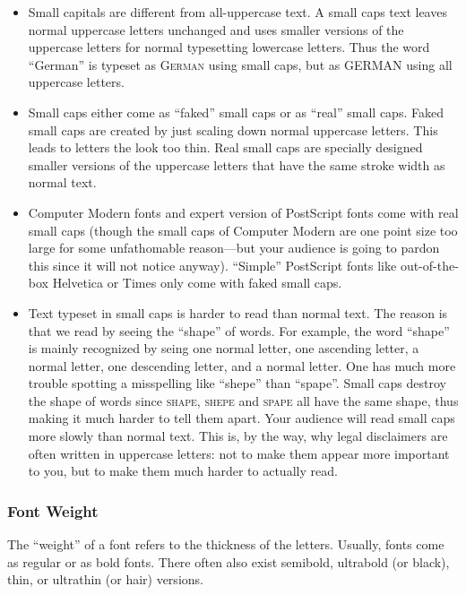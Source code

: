 \begin{itemize}
\item
  Small capitals are different from all-uppercase text. A small caps
  text leaves normal uppercase letters unchanged and uses smaller
  versions of the uppercase letters for normal typesetting lowercase
  letters. Thus the word ``German'' is typeset as \textsc{German}
  using small caps, but as \uppercase{German} using all uppercase
  letters.
\item
  Small caps either come as ``faked'' small caps or as ``real''
  small caps. Faked small caps are created by just scaling down
  normal uppercase letters. This leads to letters the look too
  thin. Real small caps are specially designed smaller versions of
  the uppercase letters that have the same stroke width as normal
  text.
\item
  Computer Modern fonts and expert version of PostScript fonts come
  with real small caps (though the small caps of Computer Modern are
  one point size too large for some unfathomable reason---but your
  audience is going to pardon this since it will not notice
  anyway). ``Simple'' PostScript fonts like out-of-the-box Helvetica
  or Times only come with faked small caps.
\item
  Text typeset in small caps is harder to read than normal text. The
  reason is that we read by seeing the ``shape'' of words. For
  example, the word ``shape'' is mainly recognized by seing one
  normal letter, one ascending letter, a normal letter, one
  descending letter, and a normal letter. One has much more trouble
  spotting a misspelling like ``shepe''  than ``spape''. Small caps
  destroy the shape of words since \textsc{shape}, \textsc{shepe}
  and \textsc{spape} all have the same shape, thus making it much
  harder to tell them apart. Your audience will read small caps more
  slowly than normal text. This is, by the way, why legal
  disclaimers are often written in uppercase letters: not to make
  them appear more important to you, but to make them much harder to
  actually read.
\end{itemize}



\subsubsection{Font Weight}

The ``weight'' of a font refers to the thickness of the
letters. Usually, fonts come as regular or as bold fonts. There often
also exist semibold, ultrabold (or black), thin, or ultrathin (or hair)
versions.

